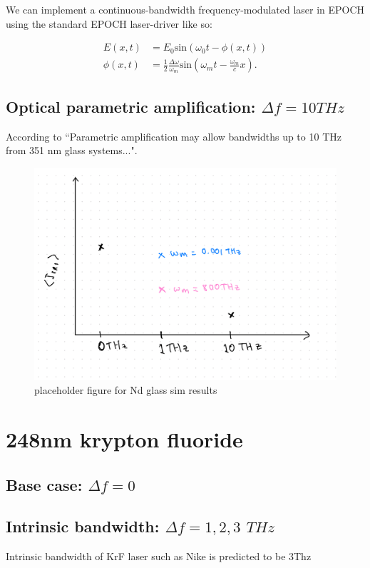 We can implement a continuous-bandwidth frequency-modulated laser in EPOCH using the standard EPOCH laser-driver like so:

\begin{equation}
\begin{aligned}
   E(x,t) &= E_0\text{sin}\left(\omega_0 t - \phi(x,t)\right) \\
   \phi(x,t) &= \frac{1}{2}\frac{\Delta\omega}{\omega_m}\text{sin}\left(\omega_mt - \frac{\omega_m}{c}x\right).
\end{aligned}
\end{equation}

\subsection{Optical parametric amplification: $\Delta f=10\si{THz}$}
According to \citet{Lehmberg2020} ``Parametric amplification may allow bandwidths up to 10 THz from 351 nm glass systems...".


\begin{figure}[ht]
   \centering
    \includegraphics[width=0.75\columnwidth]{Chapters/C5_broadband/ndglass_placeholder.jpeg}
    \caption{placeholder figure for Nd glass sim results}
    \label{fig:NdGlass}
\end{figure}{}

\section{248nm krypton fluoride}\label{sec:248}

\subsection{Base case: $\Delta f=0$}

\subsection{Intrinsic bandwidth: $\Delta f=1,2,3$ $\si{THz}$}
Intrinsic bandwidth of KrF laser such as Nike is predicted to be 3Thz \citep{Obenschain15}

